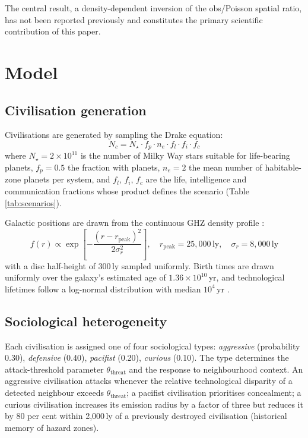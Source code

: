 \documentclass[useAMS,usenatbib]{mn2e}
\begin{document}
The central result, a density-dependent inversion of the
obs/Poisson spatial ratio, has not been reported previously and
constitutes the primary scientific contribution of this paper.

\section{Model}
\label{sec:model}

\subsection{Civilisation generation}
\label{sec:civgen}

Civilisations are generated by sampling the Drake equation:
\begin{equation}
  N_c = N_\star \cdot f_p \cdot n_e \cdot f_l \cdot f_i \cdot f_c
  \label{eq:drake}
\end{equation}
where $N_\star = 2\times10^{11}$ is the number of Milky Way stars
suitable for life-bearing planets, $f_p = 0.5$ the fraction with
planets, $n_e = 2$ the mean number of habitable-zone planets per
system, and $f_l$, $f_i$, $f_c$ are the life, intelligence and
communication fractions whose product defines the scenario (Table
\ref{tab:scenarios}).

Galactic positions are drawn from the continuous GHZ density profile
\citep{lineweaver2004}:
\begin{equation}
  f(r) \propto \exp\!\left[-\frac{(r - r_\text{peak})^2}{2\sigma_r^2}\right],
  \quad r_\text{peak} = 25{,}000\,\text{ly},\quad \sigma_r = 8{,}000\,\text{ly}
  \label{eq:ghz}
\end{equation}
with a disc half-height of 300\,ly sampled uniformly.
Birth times are drawn uniformly over the galaxy's estimated age of
$1.36\times10^{10}$\,yr, and technological lifetimes follow a
log-normal distribution with median $10^4$\,yr
\citep{sandberg2018}.

\subsection{Sociological heterogeneity}
\label{sec:socio}

Each civilisation is assigned one of four sociological types:
\emph{aggressive} (probability 0.30), \emph{defensive} (0.40),
\emph{pacifist} (0.20), \emph{curious} (0.10).
The type determines the attack-threshold parameter
$\theta_\text{threat}$ and the response to neighbourhood context.
An aggressive civilisation attacks whenever the relative
technological disparity of a detected neighbour exceeds $\theta_\text{threat}$;
a pacifist civilisation prioritises concealment; a curious civilisation
increases its emission radius by a factor of three but reduces it by
80 per cent within 2{,}000\,ly of a previously destroyed civilisation
(historical memory of hazard zones).
\end{document}
